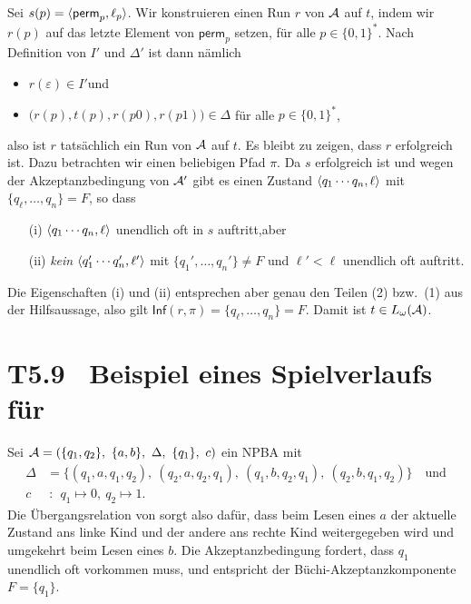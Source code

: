 \documentclass[fontsize=11pt, twoside=false, numbers=autoenddot]{scrbook}
\begin{document}
\begin{description}
    Sei $s(p) = \langle \textsf{perm}_p,\ell_p\rangle$.
    Wir konstruieren einen Run $r$ von $\mathcal{A}$ auf $t$, indem
    wir $r(p)$ auf das letzte Element von $\textsf{perm}_p$ setzen,
    für alle $p \in \{0,1\}^*$.
    Nach Definition von $I'$ und $\Delta'$ ist dann nämlich
    \begin{itemize}
      \item
        $r(\varepsilon) \in I'$\quad und
      \item
        $\Big(r(p),t(p),r(p0),r(p1)\Big) \in \Delta$ für alle $p \in \{0,1\}^*$,
    \end{itemize}
    also ist $r$ tatsächlich ein Run von $\mathcal{A}$ auf $t$.
%    
    Es bleibt zu zeigen,
    dass $r$ erfolgreich ist.
    Dazu betrachten wir einen beliebigen Pfad $\pi$.
    Da $s$ erfolgreich ist und wegen der Akzeptanzbedingung von $\mathcal{A}'$
    gibt es einen Zustand $\langle q_1\cdots q_n,\ell\rangle$ mit $\{q_\ell,\dots,q_n\} = F$,
    so dass
    \begin{enumerate}
      \item[(i)]
        $\langle q_1\cdots q_n,\ell\rangle$ unendlich oft in $s$ auftritt,\quad aber
      \item[(ii)]
        \emph{kein} $\langle q_1'\cdots q_n',\ell'\rangle$ mit $\{q_1',\dots,q_n'\} \neq F$ und $\ell' < \ell$ unendlich oft auftritt.
    \end{enumerate}
    Die Eigenschaften (i) und (ii) entsprechen aber genau den Teilen
    (2) bzw.\ (1) aus der Hilfsaussage,
    also gilt $\textsf{Inf}(r,\pi) = \{q_\ell,\dots,q_n\}=F$.
    Damit ist $t \in L_\omega(\mathcal{A})$.
    \qedhere
\end{description}

\section*{{\boldmath T5.9~ Beispiel eines Spielverlaufs für }}

Sei 
%
$\mathcal{A} = (\{q_1,q_2\},~\{a,b\},~\Delta,~\{q_1\},~c)$
ein NPBA mit
%
\begin{align*}
  \Delta & = \{(q_1,a,q_1,q_2),~(q_2,a,q_2,q_1),~(q_1,b,q_2,q_1),~(q_2,b,q_1,q_2)\} \quad\text{und} \\
  c      & ~:~~ q_1 \mapsto 0,~ q_2 \mapsto 1.
\end{align*}
%
Die Übergangsrelation von \Amc sorgt also dafür, dass beim Lesen eines $a$
der aktuelle Zustand ans linke Kind und der andere ans rechte Kind weitergegeben wird
und umgekehrt beim Lesen eines $b$. Die Akzeptanzbedingung fordert,
dass $q_1$ unendlich oft vorkommen muss, und entspricht der
Büchi-Akzeptanzkomponente $F = \{q_1\}$.
\end{document}
